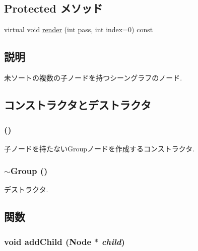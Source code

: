 \subsection*{Protected メソッド}
\begin{CompactItemize}
\item 
virtual void \hyperlink{classm3g_1_1Group_1efcb1973989d9963d5bd6d03065d389}{render} (int pass, int index=0) const 
\end{CompactItemize}


\subsection{説明}
未ソートの複数の子ノードを持つシーングラフのノード. 

\subsection{コンストラクタとデストラクタ}
\hypertarget{classm3g_1_1Group_0b29b9393b4b6856ac75b759f4166c13}{
\subsubsection[{Group}]{ ()}}
\label{classm3g_1_1Group_0b29b9393b4b6856ac75b759f4166c13}


子ノードを持たないGroupノードを作成するコンストラクタ. \hypertarget{classm3g_1_1Group_a2a755272411c0d861f46f30970f5ca5}{
\subsubsection[{$\sim$Group}]{\setlength{\rightskip}{0pt plus 5cm}$\sim${\bf Group} ()}}
\label{classm3g_1_1Group_a2a755272411c0d861f46f30970f5ca5}


デストラクタ. 

\subsection{関数}
\hypertarget{classm3g_1_1Group_f7c798f6f7924dc14403df261f82153a}{
\subsubsection[{addChild}]{\setlength{\rightskip}{0pt plus 5cm}void addChild ({\bf Node} $\ast$ {\em child})}}
\label{classm3g_1_1Group_f7c798f6f7924dc14403df261f82153a}


